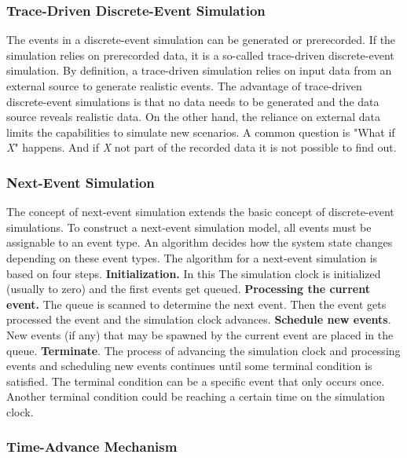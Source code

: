 \subsubsection{Trace-Driven Discrete-Event Simulation}

The events in a discrete-event simulation can be generated or prerecorded. If the simulation relies on prerecorded data, it is a so-called trace-driven discrete-event simulation.
By definition, a trace-driven simulation relies on input data from an external source to generate realistic events. \cite{leemis2006discrete} The advantage of trace-driven discrete-event simulations is that no data needs to be generated and the data source reveals realistic data. On the other hand, the reliance on external data limits the capabilities to simulate new scenarios. A common question is "What if \textit{X}" happens. And if \textit{X} not part of the recorded data it is not possible to find out.


\subsubsection{Next-Event Simulation}
\label{des:nextevent}

The concept of next-event simulation extends the basic concept of discrete-event simulations. To construct a next-event simulation model, all events must be assignable to an event type. An algorithm decides how the system state changes depending on these event types.
\cite[chapter 5]{leemis2006discrete}
The algorithm for a next-event simulation is based on four steps.
\textbf{Initialization.} In this The simulation clock is initialized (usually to zero) and the first events get queued.
\textbf{Processing the current event.} The queue is scanned to determine the next event. Then the event gets processed the event and the simulation clock advances.
\textbf{Schedule new events}. New events (if any) that may be spawned by the current event are placed in the queue.
\textbf{Terminate}. The process of advancing the simulation clock and processing events and scheduling new events continues until some terminal condition is satisfied. The terminal condition can be a specific event that only occurs once. Another terminal condition could be reaching a certain time on the simulation clock.


\subsubsection{Time-Advance Mechanism}
\label{des:timeadvance}


